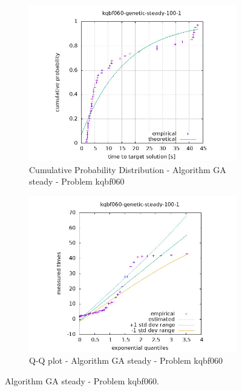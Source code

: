 \begin{figure}[H]
    \centering
    \begin{subfigure}{0.49\textwidth}
        \includegraphics[width=\textwidth]{figure/ttt_plot/kqbf060-genetic-steady-100-1-exp.jpeg}
        \caption{Cumulative Probability Distribution - Algorithm GA steady - Problem kqbf060}
        \label{fig:ga-steady-kqbf060-exp}
    \end{subfigure}
    \hfill
    \begin{subfigure}{0.49\textwidth}
        \includegraphics[width=\textwidth]{figure/ttt_plot/kqbf060-genetic-steady-100-1-qq.jpeg}
        \caption{Q-Q plot - Algorithm GA steady - Problem kqbf060}
        \label{fig:ga-steady-kqbf060-qq}
    \end{subfigure}
    \caption{Algorithm GA steady - Problem kqbf060.}
    \label{fig:ga-steady-kqbf060}
\end{figure}


